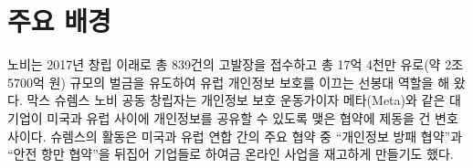 \documentclass{translation}
\begin{document}
\section{주요 배경}
% 

노비는 2017년 창립 이래로 총 839건의 고발장을 접수하고 총 17억 4천만 유로(약 2조 5700억 원) 규모의 벌금을 유도하여 유럽 개인정보 보호를 이끄는 선봉대 역할을 해 왔다.
막스 슈렘스 노비 공동 창립자는 개인정보 보호 운동가이자 메타(Meta)와 같은 대기업이 미국과 유럽 사이에 개인정보를 공유할 수 있도록 맺은 협약에 제동을 건 변호사이다.
슈렘스의 활동은 미국과 유럽 연합 간의 주요 협약 중 ``개인정보 방패 협약''과 ``안전 항만 협약''을 뒤집어 기업들로 하여금 온라인 사업을 재고하게 만들기도 했다. 
\end{document}
